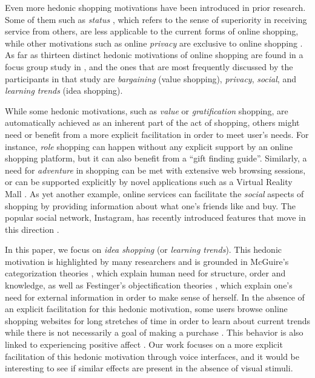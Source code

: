 Even more hedonic shopping motivations have been introduced in prior research. Some of them such as \textit{status} \cite{hedonictabagh1}, which refers to the sense of superiority in receiving service from others, are less applicable to the current forms of online shopping, while other motivations such as online \textit{privacy} are exclusive to online shopping \cite{flowguy}. As far as thirteen distinct hedonic motivations of online shopping are found in a focus group study in \cite{flowguy}, and the ones that are most frequently discussed by the participants in that study are \textit{bargaining} (value shopping), \textit{privacy}, \textit{social}, and \textit{learning trends} (idea shopping).

While some hedonic motivations, such as \textit{value} or \textit{gratification} shopping, are automatically achieved as an inherent part of the act of shopping, others might need or benefit from a more explicit facilitation in order to meet user's needs. For instance, \textit{role} shopping can happen without any explicit support by an online shopping platform, but it can also benefit from a ``gift finding guide''. Similarly, a need for \textit{adventure} in shopping can be met with extensive web browsing sessions, or can be supported explicitly by novel applications such as a Virtual Reality Mall \cite{vrshopp}. As yet another example, online services can facilitate the \textit{social} aspects of shopping by providing information about what one's friends like and buy. The popular social network, Instagram, has recently introduced features that move in this direction \cite{insta}.

In this paper, we focus on \textit{idea shopping} (or \textit{learning trends}). This hedonic motivation is highlighted by many researchers \cite{tauber1972people,hedonictabagh2,flowguy} and is grounded in McGuire's categorization theories \cite{ideaground1}, which explain human need for structure, order and knowledge, as well as Festinger's objectification theories \cite{ideaground2}, which explain one's need for external information in order to make sense of herself. In the absence of an explicit facilitation for this hedonic motivation, some users browse online shopping websites for long stretches of time in order to learn about current trends while there is not necessarily a goal of making a purchase \cite{broooowse}. This behavior is also linked to experiencing positive affect \cite{funsearch}. Our work focuses on a more explicit facilitation of this hedonic motivation through voice interfaces, and it would be interesting to see if similar effects are present in the absence of visual stimuli. 


